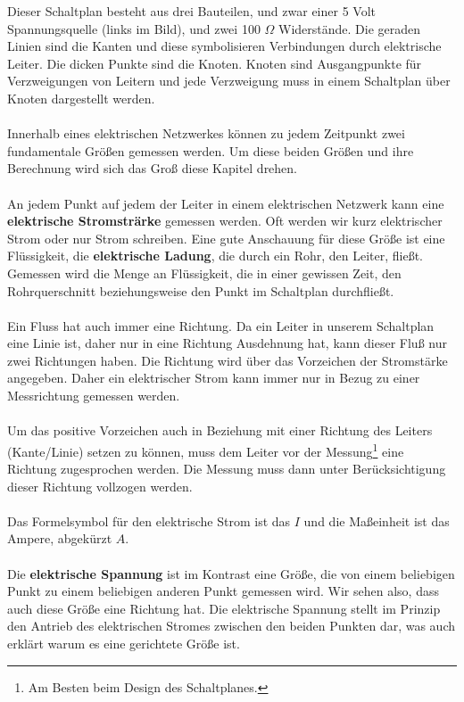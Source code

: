 \documentclass[11pt,a4paper,leqno]{report}
\numberwithin{equation}{chapter}
\begin{document}
\noindent
Dieser Schaltplan besteht aus drei Bauteilen, und zwar einer 5 Volt Spannungsquelle (links im Bild), und zwei 100 $\Omega$ Widerst\"ande.
Die geraden Linien sind die Kanten und diese symbolisieren Verbindungen durch elektrische Leiter. Die dicken Punkte sind die Knoten. Knoten sind Ausgangpunkte f\"ur Verzweigungen von Leitern und jede Verzweigung muss in einem Schaltplan \"uber Knoten dargestellt werden.\\
\\
Innerhalb eines elektrischen Netzwerkes k\"onnen zu jedem Zeitpunkt zwei fundamentale Gr\"o\ss{}en gemessen werden. Um diese beiden Gr\"o\ss{}en und ihre Berechnung wird sich das Gro\ss{} diese Kapitel drehen.\\
\\
An jedem Punkt auf jedem der Leiter in einem elektrischen Netzwerk kann eine \textbf{elektrische Stromstr\"arke} gemessen werden. Oft werden wir kurz elektrischer Strom oder nur Strom schreiben.
Eine gute Anschauung f\"ur diese Gr\"o\ss{}e ist eine Fl\"ussigkeit, die \textbf{elektrische Ladung}, die durch ein Rohr, den Leiter, flie\ss{}t. 
Gemessen wird die Menge an Fl\"ussigkeit, die in einer gewissen Zeit, den Rohrquerschnitt beziehungsweise den Punkt im Schaltplan durchflie\ss{}t.\\
\\
Ein Fluss hat auch immer eine Richtung. Da ein Leiter in unserem Schaltplan eine Linie ist, daher nur in eine Richtung Ausdehnung hat, kann dieser Flu\ss{} nur zwei Richtungen haben. Die Richtung wird \"uber das Vorzeichen der Stromst\"arke angegeben. Daher ein elektrischer Strom kann immer nur in Bezug zu einer Messrichtung gemessen werden.\\
\\
Um das positive Vorzeichen auch in Beziehung mit einer Richtung des Leiters (Kante/Linie) setzen zu k\"onnen, muss dem Leiter vor der Messung\footnote{Am Besten beim Design des Schaltplanes.} eine Richtung zugesprochen werden. Die Messung muss dann unter Ber\"ucksichtigung dieser Richtung vollzogen werden.\\
\\
Das Formelsymbol f\"ur den elektrische Strom ist das $I$ und die Ma\ss{}einheit ist das Ampere, abgek\"urzt $A$. 
\\
\\
Die \textbf{elektrische Spannung} ist im Kontrast eine Gr\"o\ss{}e, die von einem beliebigen Punkt zu einem beliebigen anderen Punkt gemessen wird. Wir sehen also, dass auch diese Gr\"o\ss{}e eine Richtung hat. Die elektrische Spannung stellt im Prinzip den Antrieb des elektrischen Stromes zwischen den beiden Punkten dar, was auch erkl\"art warum es eine gerichtete Gr\"o\ss{}e ist. \\
\end{document}
